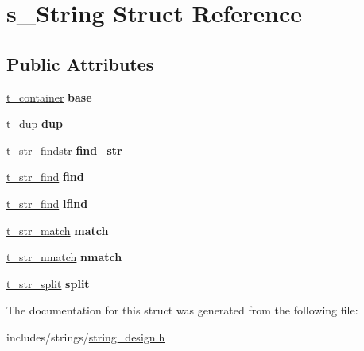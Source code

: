 \hypertarget{structs__String}{}\section{s\+\_\+\+String Struct Reference}
\label{structs__String}
\subsection*{Public Attributes}
\begin{DoxyCompactItemize}
\item 
\hyperlink{container__design_8h_a2baa2855e4617ebc7ad317f13fda1cbe}{t\+\_\+container} {\bfseries base}\hypertarget{structs__String_a282505c4302fdb15aabd7c45f4003c29}{}\label{structs__String_a282505c4302fdb15aabd7c45f4003c29}

\item 
\hyperlink{string__design_8h_a142918c94b762406f529a28ebe7c1be5}{t\+\_\+dup} {\bfseries dup}\hypertarget{structs__String_aab4bb4983eff73aa597b3f95e23d5395}{}\label{structs__String_aab4bb4983eff73aa597b3f95e23d5395}

\item 
\hyperlink{string__design_8h_aeac100a52d95b7dd0a45b6492d65af6e}{t\+\_\+str\+\_\+findstr} {\bfseries find\+\_\+str}\hypertarget{structs__String_adf49247053e5682ca186c0d7437a0014}{}\label{structs__String_adf49247053e5682ca186c0d7437a0014}

\item 
\hyperlink{string__design_8h_a12a4daaa53dc2aa57a69c6afb297c60a}{t\+\_\+str\+\_\+find} {\bfseries find}\hypertarget{structs__String_a390ecaa311d5f525c0658d99ac51d991}{}\label{structs__String_a390ecaa311d5f525c0658d99ac51d991}

\item 
\hyperlink{string__design_8h_a12a4daaa53dc2aa57a69c6afb297c60a}{t\+\_\+str\+\_\+find} {\bfseries lfind}\hypertarget{structs__String_aae9e2d0a26d5b24d1adfb11eaca0d52e}{}\label{structs__String_aae9e2d0a26d5b24d1adfb11eaca0d52e}

\item 
\hyperlink{string__design_8h_ac0a7451e5fdf3aab95e263597d8cf23f}{t\+\_\+str\+\_\+match} {\bfseries match}\hypertarget{structs__String_a271b6be080f7fce06c2714fce445b937}{}\label{structs__String_a271b6be080f7fce06c2714fce445b937}

\item 
\hyperlink{string__design_8h_a58da945c23dccd4ef1e579a0366ecf3a}{t\+\_\+str\+\_\+nmatch} {\bfseries nmatch}\hypertarget{structs__String_aba9639f68e55d94d3b08ebc52543ef1b}{}\label{structs__String_aba9639f68e55d94d3b08ebc52543ef1b}

\item 
\hyperlink{string__design_8h_a3749b534e36da9562688d0c6d400481c}{t\+\_\+str\+\_\+split} {\bfseries split}\hypertarget{structs__String_a828cdc78bda5733ab202775eba420a75}{}\label{structs__String_a828cdc78bda5733ab202775eba420a75}

\end{DoxyCompactItemize}


The documentation for this struct was generated from the following file\+:\begin{DoxyCompactItemize}
\item 
includes/strings/\hyperlink{string__design_8h}{string\+\_\+design.\+h}\end{DoxyCompactItemize}
